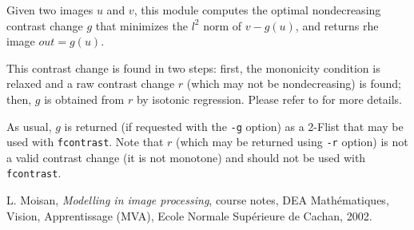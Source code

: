 Given two images $u$ and $v$, this module computes the optimal 
nondecreasing contrast change $g$ that minimizes the $l^2$ norm of $v-g(u)$,
and returns rhe image $out = g(u)$.

\medskip

This contrast change is found in two steps: first, the mononicity condition
is relaxed and a raw contrast change $r$ (which may not be nondecreasing) 
is found; then, $g$ is obtained from $r$ by isotonic regression.
Please refer to \cite{moisan} for more details.

\medskip

As usual, $g$ is returned (if requested with the \verb+-g+ option)
as a 2-Flist that may be used with \verb+fcontrast+.
Note that $r$ (which may be returned using \verb+-r+ option) is not
a valid contrast change (it is not monotone) 
and should not be used with \verb+fcontrast+.

\begin{thebibliography}{1}

L. Moisan, {\it Modelling in image processing},
course notes, DEA Math\'ematiques, Vision, Apprentissage (MVA),
Ecole Normale Sup\'erieure de Cachan, 2002.

\end{thebibliography}
